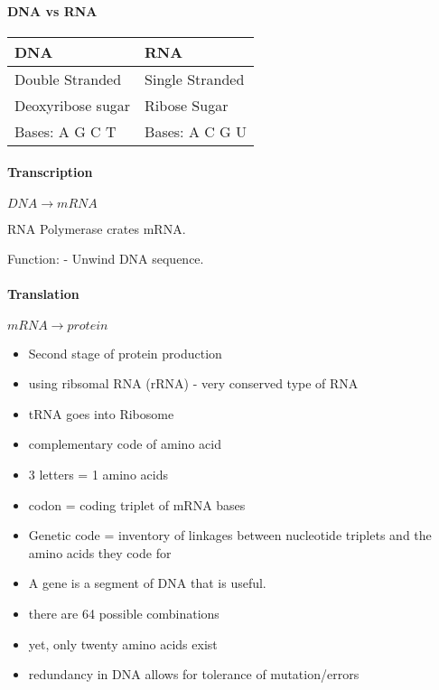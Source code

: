 \hypertarget{dna-vs-rna}{%
\paragraph{DNA vs RNA}\label{dna-vs-rna}}

\begin{longtable}[]{@{}ll@{}}
\toprule
DNA & RNA\tabularnewline
\midrule
\endhead
Double Stranded & Single Stranded\tabularnewline
Deoxyribose sugar & Ribose Sugar\tabularnewline
Bases: A G C T & Bases: A C G U\tabularnewline
\bottomrule
\end{longtable}

\hypertarget{transcription}{%
\paragraph{Transcription}\label{transcription}}

\(DNA \rightarrow mRNA\)

RNA Polymerase crates mRNA.

Function: - Unwind DNA sequence.

\hypertarget{translation}{%
\paragraph{Translation}\label{translation}}

\(mRNA \rightarrow protein\)

\begin{itemize}
\tightlist
\item
  Second stage of protein production
\item
  using ribsomal RNA (rRNA) - very conserved type of RNA
\item
  tRNA goes into Ribosome
\item
  complementary code of amino acid
\item
  3 letters = 1 amino acids
\item
  codon = coding triplet of mRNA bases
\item
  Genetic code = inventory of linkages between nucleotide triplets and
  the amino acids they code for
\item
  A gene is a segment of DNA that is useful.
\item
  there are 64 possible combinations
\item
  yet, only twenty amino acids exist
\item
  redundancy in DNA allows for tolerance of mutation/errors
\end{itemize}

